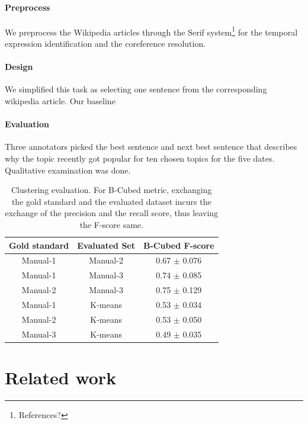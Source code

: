 \documentclass[11pt]{article}
\begin{document}
\paragraph {Preprocess}
We preprocess the Wikipedia articles through the Serif system\footnote{References?} for the temporal expression identification and the coreference resolution.

\paragraph {Design}
We simplified this task as selecting one sentence from the corresponding wikipedia article. Our baseline 

\paragraph {Evaluation}
Three annotators picked the best sentence and next best sentence that describes why the topic recently got popular for ten chosen topics for the five dates. Qualitative examination was done.

\begin{table}
\centering
\begin{tabular}{|c|c|c|}
\hline
Gold standard & Evaluated Set & B-Cubed F-score \\
\hline
Manual-1 & Manual-2 & 0.67 $\pm$ {\small 0.076} \\
Manual-1 & Manual-3 & 0.74 $\pm$ {\small 0.085} \\
Manual-2 & Manual-3 & 0.75 $\pm$ {\small 0.129} \\
\hline
Manual-1 & K-means & 0.53 $\pm$ {\small 0.034} \\
Manual-2 & K-means & 0.53 $\pm$ {\small 0.050} \\
Manual-3 & K-means & 0.49 $\pm$ {\small 0.035} \\
\hline
\end{tabular}
\caption{Clustering evaluation. For B-Cubed metric, exchanging the gold standard and the evaluated dataset incurs the exchange of the precision and the recall score, thus leaving the F-score same.}
\label{tab:clustering}
\end{table}

\section{Related work}
\label{sec:related-work}
\end{document}
